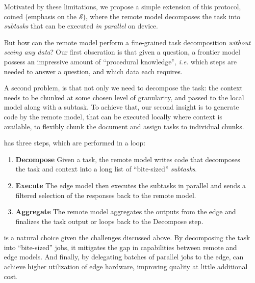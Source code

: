 Motivated by these limitations, we propose a simple extension of this protocol, coined \system  (emphasis on the $\mathcal{S}$), where the remote model decomposes the task into \emph{subtasks} that can be executed \emph{in parallel} on device. 

But how can the remote model perform a fine-grained task decomposition \emph{without seeing any data}? Our first obseration is that given a question, a frontier model possess an impressive amount of ``procedural knowledge'', \textit{i.e.} which steps are needed to answer a question, and which data each requires.

A second problem, is that not only we need to decompose the task: the context needs to be chunked at some chosen level of granularity, and passed to the local model along with a subtask.  To achieve that, our second insight is to generate code by the remote model, that can be executed locally where context is available, to flexibly chunk the document and assign tasks to individual chunks.

% 
\system has three steps, which are performed in a loop:
\begin{enumerate}
    \item \textbf{Decompose} Given a task, the remote model writes code that decomposes the task and context into a long list of ``bite-sized'' \textit{subtasks}.
    \item \textbf{Execute} The edge model then executes the subtasks in parallel and sends a filtered selection of the responses back to the remote model.
    \item \textbf{Aggregate} The remote model aggregates the outputs from the edge and finalizes the task output or loops back to the Decompose step.
\end{enumerate}

\system is a natural choice given the challenges discussed above. By decomposing the task into “bite-sized” jobs, it mitigates the gap in capabilities between remote and edge models. And finally, by delegating batches of parallel jobs to the edge, \system can achieve higher utilization of edge hardware, improving quality at little additional cost. 



